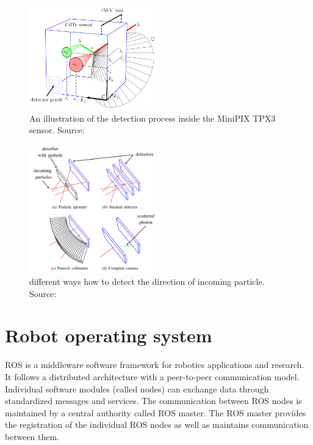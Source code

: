 \begin{figure}[!h]
    \centering
  \includegraphics[width=0.5\textwidth]{./fig/photos/minipix.png}
    \caption{An illustration of the detection process inside the MiniPIX TPX3 sensor. Source: \cite{baca2021gamma}}
    \label{fig:minipix}
\end{figure}

\begin{figure}[!h]
    \centering
    \includegraphics[width=0.5\textwidth]{./fig/photos/detector_overview_baca2019.png}
    \caption{different ways how to detect the direction of incoming particle. Source: \cite{baca2019timepix}}
    \label{fig:sensor_overview}
\end{figure}



\section{Robot operating system}

\ac{ROS} is a middleware software framework for robotics applications and research.
It follows a distributed architecture with a peer-to-peer communication model.
Individual software modules (called nodes) can exchange data through standardized messages and services.
The communication between \ac{ROS} nodes is maintained by a central authority called \ac{ROS} master.
The \ac{ROS} master provides the registration of the individual \ac{ROS} nodes as well as maintains communication between them.

